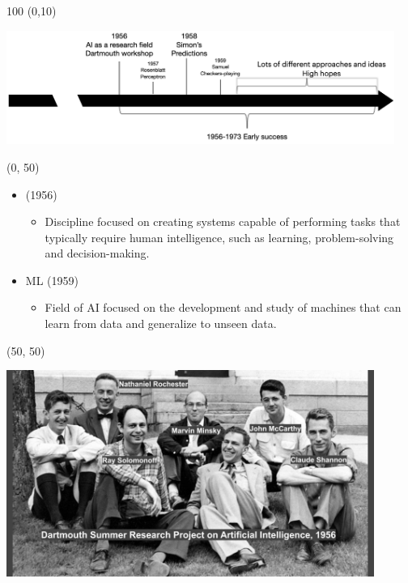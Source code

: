 \begin{frame}
  \begin{textblock}{100} (0,10)
    \begin{center}
      \includegraphics[width=0.95\textwidth]{img/ai_history_1956_1973.png}
    \end{center}
  \end{textblock}

  \begin{textblock}{50}(0, 50)
    \begin{itemize}
      \item {} (1956)
        \begin{itemize}
        \item \footnotesize Discipline focused on creating systems capable of performing tasks that typically require human intelligence, such as learning, problem-solving and decision-making.
        \end{itemize}
      \item<2-> \acl{ML} (1959)
        \begin{itemize}
        \item \footnotesize Field of AI focused on the development and study of machines that can learn from data and generalize to unseen data.
        \end{itemize}
      \end{itemize}
    \end{textblock}

    \begin{textblock}{50}(50, 50)
      \begin{center}
        \includegraphics[width=0.9\textwidth]{img/dartmouth-conference.jpg}
      \end{center}
    \end{textblock}

\end{frame}


